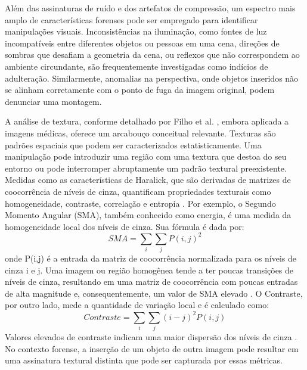 
Além das assinaturas de ruído e dos artefatos de compressão, um espectro mais amplo de características forenses pode ser empregado para identificar manipulações visuais. Inconsistências na iluminação, como fontes de luz incompatíveis entre diferentes objetos ou pessoas em uma cena, direções de sombras que desafiam a geometria da cena, ou reflexos que não correspondem ao ambiente circundante, são frequentemente investigadas como indícios de adulteração. Similarmente, anomalias na perspectiva, onde objetos inseridos não se alinham corretamente com o ponto de fuga da imagem original, podem denunciar uma montagem.

A análise de textura, conforme detalhado por Filho et al. \cite{filho_etal_texturas}, embora aplicada a imagens médicas, oferece um arcabouço conceitual relevante. Texturas são padrões espaciais que podem ser caracterizados estatisticamente. Uma manipulação pode introduzir uma região com uma textura que destoa do seu entorno ou pode interromper abruptamente um padrão textural preexistente. Medidas como as características de Haralick, que são derivadas de matrizes de coocorrência de níveis de cinza, quantificam propriedades texturais como homogeneidade, contraste, correlação e entropia \cite{filho_etal_texturas}. Por exemplo, o Segundo Momento Angular (SMA), também conhecido como energia, é uma medida da homogeneidade local dos níveis de cinza. Sua fórmula é dada por:
\begin{equation}
SMA = \sum_{i}\sum_{j}P(i,j)^2
\label{eq:sma}
\end{equation}
onde P(i,j) é a entrada da matriz de coocorrência normalizada para os níveis de cinza i e j. Uma imagem ou região homogênea tende a ter poucas transições de níveis de cinza, resultando em uma matriz de coocorrência com poucas entradas de alta magnitude e, consequentemente, um valor de SMA elevado \cite{filho_etal_texturas}. O Contraste, por outro lado, mede a quantidade de variação local e é calculado como:
\begin{equation}
Contraste = \sum_{i}\sum_{j}(i-j)^2 P(i,j)
\label{eq:contraste}
\end{equation}
Valores elevados de contraste indicam uma maior dispersão dos níveis de cinza \cite{filho_etal_texturas}. No contexto forense, a inserção de um objeto de outra imagem pode resultar em uma assinatura textural distinta que pode ser capturada por essas métricas.

